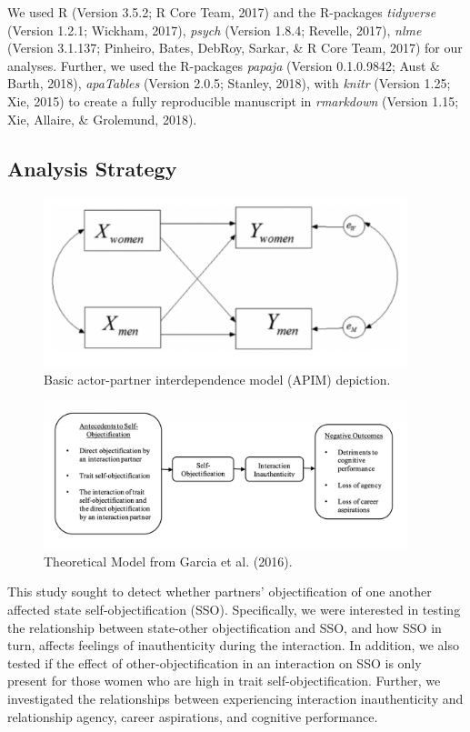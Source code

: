 \documentclass[man]{apa6}
\begin{document}
We used R (Version 3.5.2; R Core Team, 2017) and the R-packages
\emph{tidyverse} (Version 1.2.1; Wickham, 2017), \emph{psych} (Version
1.8.4; Revelle, 2017), \emph{nlme} (Version 3.1.137; Pinheiro, Bates,
DebRoy, Sarkar, \& R Core Team, 2017) for our analyses. Further, we used
the R-packages \emph{papaja} (Version 0.1.0.9842; Aust \& Barth, 2018),
\emph{apaTables} (Version 2.0.5; Stanley, 2018), with \emph{knitr}
(Version 1.25; Xie, 2015) to create a fully reproducible manuscript in
\emph{rmarkdown} (Version 1.15; Xie, Allaire, \& Grolemund, 2018).

\subsection{Analysis Strategy}\label{analysis-strategy}

\begin{figure}
\includegraphics[width=400px]{APIM_figure} \caption{Basic actor-partner interdependence model (APIM) depiction.}\label{fig:apim}
\end{figure}

\begin{figure}
\includegraphics[width=400px]{theor_figure} \caption{Theoretical Model from Garcia et al. (2016).}\label{fig:theorfigure}
\end{figure}

This study sought to detect whether partners' objectification of one
another affected state self-objectification (SSO). Specifically, we were
interested in testing the relationship between state-other
objectification and SSO, and how SSO in turn, affects feelings of
inauthenticity during the interaction. In addition, we also tested if
the effect of other-objectification in an interaction on SSO is only
present for those women who are high in trait self-objectification.
Further, we investigated the relationships between experiencing
interaction inauthenticity and relationship agency, career aspirations,
and cognitive performance.
\end{document}
